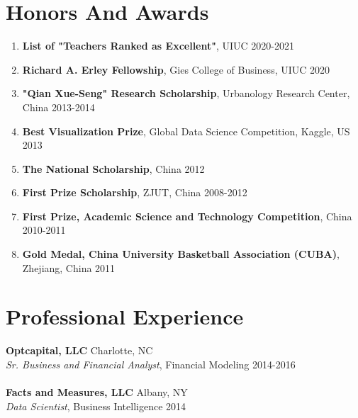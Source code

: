 \documentclass[margin,line]{resume}
\begin{document}
\begin{resume}
 	  \section{\mysidestyle Honors And Awards} 
 	  \begin{enumerate}[topsep=0pt, leftmargin=*]
 	     \item \textbf{List of "Teachers Ranked as Excellent"}, UIUC \hfill 2020-2021
 	     \item \textbf{Richard A. Erley Fellowship}, Gies College of Business, UIUC \hfill 2020
 	     \item \textbf{"Qian Xue-Seng" Research Scholarship}, Urbanology Research Center, China \hfill 2013-2014
 	     \item \textbf{Best Visualization Prize}, Global Data Science Competition, Kaggle, US  \hfill 2013
 	     \item \textbf{The National Scholarship}, China \hfill 2012
 	     \item \textbf{First Prize Scholarship}, ZJUT, China \hfill  2008-2012
 	     \item \textbf{First Prize, Academic Science and Technology Competition}, China \hfill 2010-2011
 	     \item \textbf{Gold Medal, China University Basketball Association (CUBA)}, Zhejiang, China \hfill 2011
 	  \end{enumerate}
    
 	  \section{\mysidestyle Professional Experience} 
         \textbf{Optcapital, LLC} \hfill Charlotte, NC\\
         {\sl Sr. Business and Financial Analyst}, Financial Modeling \hfill 2014-2016\\
         \\
         \textbf{Facts and Measures, LLC} \hfill Albany, NY\\
         {\sl Data Scientist}, Business Intelligence \hfill 2014


\end{resume}
\end{document}

